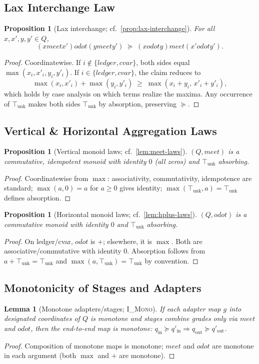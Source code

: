 \documentclass[11pt]{article}
\theoremstyle{plain}
\newtheorem{lemma}[theorem]{Lemma}
\newtheorem{proposition}[theorem]{Proposition}
\theoremstyle{definition}
\theoremstyle{remark}
\def\Q{Q}%
\def\vmeet{meet}%
\def\hplus{odot}%
\def\code#1{#1}%
\DeclareRobustCommand{\Q}{\texorpdfstring{\ensuremath{\mathcal{Q}}}{Q}}     %
\newcommand{\unk}{\top_{\mathrm{unk}}}         %
\newcommand{\vmeet}{\wedge}                    %
\newcommand{\hplus}{\odot}                     %
\newcommand{\geqQ}{\succeq}
\newcommand{\code}[1]{\texttt{\textup{#1}}}    %
\newcommand{\ledger}{\code{ledger}}
\newcommand{\cvar}{\code{cvar}}
\newcommand{\IMono}{\textsc{I\_Mono}}
\def\Q{Q}%
\def\vmeet{meet}%
\def\hplus{odot}%
\def\code#1{#1}%
\begin{document}
\subsection{Lax Interchange Law}
\begin{proposition}[Lax interchange; cf.\ \cref{prop:lax-interchange}]
\label{prop:app-lax}
For all $x,x',y,y'\in\Q$,
\[
  (x\vmeet x') \hplus (y\vmeet y') \;\geqQ\; (x\hplus y)\vmeet(x'\hplus y').
\]
\end{proposition}
\begin{proof}
Coordinatewise. If $i\notin\{\ledger,\cvar\}$, both sides equal $\max(x_i,x'_i,y_i,y'_i)$. If $i\in\{\ledger,\cvar\}$, the claim reduces to
\[
  \max(x_i,x'_i) + \max(y_i,y'_i) \;\ge\; \max(x_i+y_i,\,x'_i+y'_i),
\]
which holds by case analysis on which terms realize the maxima. Any occurrence of $\unk$ makes both sides $\unk$ by absorption, preserving $\geqQ$.
\end{proof}

\subsection{Vertical \& Horizontal Aggregation Laws}
\begin{proposition}[Vertical monoid laws; cf.\ \cref{lem:meet-laws}]
\label{prop:app-vertical}
$(\Q,\vmeet)$ is a commutative, idempotent monoid with identity $0$ (all zeros) and $\unk$ absorbing.
\end{proposition}
\begin{proof}
Coordinatewise from $\max$: associativity, commutativity, idempotence are standard; $\max(a,0)=a$ for $a\ge0$ gives identity; $\max(\unk,a)=\unk$ defines absorption.
\end{proof}

\begin{proposition}[Horizontal monoid laws; cf.\ \cref{lem:hplus-laws}]
\label{prop:app-horizontal}
$(\Q,\hplus)$ is a commutative monoid with identity $0$ and $\unk$ absorbing.
\end{proposition}
\begin{proof}
On \ledger/\cvar, $\hplus$ is $+$; elsewhere, it is $\max$. Both are associative/commutative with identity $0$. Absorption follows from $a+\unk=\unk$ and $\max(a,\unk)=\unk$ by convention.
\end{proof}

\subsection{Monotonicity of Stages and Adapters}
\begin{lemma}[Monotone adapters/stages; \IMono]
\label{lem:app-mono}
If each adapter map $g$ into designated coordinates of $\Q$ is monotone and stages combine grades only via $\vmeet$ and $\hplus$, then the end-to-end map is monotone: $q_{\mathrm{in}}\geqQ q'_{\mathrm{in}} \Rightarrow q_{\mathrm{out}}\geqQ q'_{\mathrm{out}}$.
\end{lemma}
\begin{proof}
Composition of monotone maps is monotone; $\vmeet$ and $\hplus$ are monotone in each argument (both $\max$ and $+$ are monotone).
\end{proof}
\end{document}
